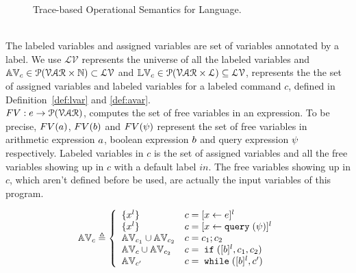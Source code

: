 {\begin{figure}
{
}
    \caption{Trace-based Operational Semantics for Language.}
    \label{fig:os}
\end{figure}
\\
The labeled variables and assigned variables are set of variables annotated by a label. 
We use  
$\mathcal{LV}$ represents the universe of all the labeled variables and 
$\mathbb{AV}_c \in \mathcal{P}(\mathcal{VAR} \times \mathbb{N}) \subset \mathcal{LV}$ and 
$\mathbb{LV}_c \in \mathcal{P}(\mathcal{VAR} \times \mathcal{L}) \subseteq \mathcal{LV}$,
represents the the set of assigned variables and labeled variables for a labeled command $c$,
defined in Definition~\ref{def:lvar} and \ref{def:avar}.
%
\\
$FV: e \to \mathcal{P}(\mathcal{VAR})$, computes the set of free variables in an expression. To be precise,
$FV(a)$, $FV(b)$ and $FV(\psi)$ represent the set of free variables in arithmetic
expression $a$, boolean expression $b$ and query expression $\psi$ respectively.
Labeled variables in $c$ is the set of assigned variables and all the free variables
showing up in $c$ with a default label $in$. 
The free variables
showing up in $c$, which aren't defined before be used, are actually the input variables of this program.
%
\begin{defn}
\label{def:avar}
{\footnotesize
$$ \avar_{c} \triangleq
  \left\{
  \begin{array}{ll}
      \{{x}^l\}                   
      & {c} = [{\assign x e}]^{l} 
      \\
      \{{x}^l\}                   
      & {c} = [{\assign x \query(\qexpr)}]^{l} 
      \\
      \avar_{{c_1}} \cup \avar_{{c_2}}  
      & {c} = {c_1};{c_2}
      \\
      \avar_{{c}} \cup \avar_{{c_2}} 
      & {c} =\eif([\bexpr]^{l}, c_1, c_2) 
      \\
      \avar_{{c}'}
      & {c}   = \ewhile ([\bexpr]^{l}, {c}')
\end{array}
\right.
$$
}
\end{defn}
%

}
